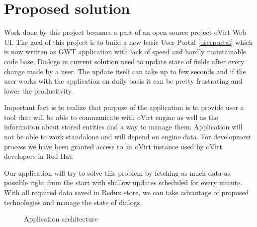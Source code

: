 \chapter{Proposed solution}
Work done by this project becomes a part of an open source project oVirt Web UI. The goal of this project is to build a new basic User Portal \ref{userportal} which is now written as GWT\cite{gwt} application with lack of speed and hardly maintainable code base. Dialogs in current solution need to update state of fields after every change made by a user. The update itself can take up to few seconds and if the user works with the application on daily basis it can be pretty frustrating and lower the productivity.

Important fact is to realize that purpose of the application is to provide user a tool that will be able to communicate with oVirt engine as well as the information about stored entities and a way to manage them. Application will not be able to work standalone and will depend on engine data. For development process we have been granted access to an oVirt instance used by oVirt developers in Red Hat.  

Our application will try to solve this problem by fetching as much data as possible right from the start with shallow updates scheduled for every minute. With all required data saved in Redux store, we can take advantage of proposed technologies and manage the state of dialogs.

\begin{figure}[h]
\caption{Application architecture}
\label{vector}
\end{figure}

